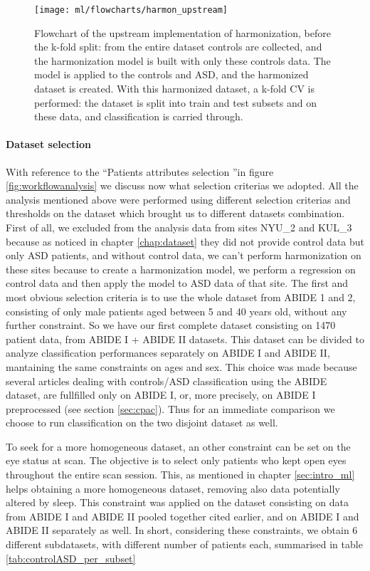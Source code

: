 \documentclass[11pt]{report}
\begin{document}
\begin{figure}[h!]
\centering
\texttt{[image: ml/flowcharts/harmon\_upstream]}
\caption{Flowchart of the upstream implementation of harmonization, before the k-fold split: from the entire dataset controls are collected, and the harmonization model is built with only these controls data. The model is applied to the controls and ASD, and the harmonized dataset is created. With this harmonized dataset, a k-fold CV is performed: the dataset is split into train and test subsets and on these data, and classification is carried through.}
\label{fig:harmon_upstream_flowchart}
\end{figure}


\paragraph{Dataset selection} \hfill

With reference to the \textquotedblleft Patients attributes selection \textquotedblright in figure \ref{fig:workflowanalysis} we discuss now what selection criterias we adopted.
All the analysis mentioned above were performed using different selection criterias and thresholds on the dataset which brought us to different datasets combination.
First of all, we excluded from the analysis data from sites NYU\_2 and KUL\_3 because as noticed in chapter \ref{chap:dataset} they did not provide control data but only ASD patients, and without control data, we can't perform harmonization on these sites because to create a harmonization model, we perform a regression on control data and then apply the model to ASD data of that site.
The first and most obvious selection criteria is to use the whole dataset from ABIDE 1 and 2, consisting of only male patients aged between 5 and 40 years old, without any further constraint. So we have our first complete dataset consisting on 1470 patient data, from ABIDE I + ABIDE II datasets.
This dataset can be divided to analyze classification performances separately on ABIDE I and ABIDE II, mantaining the same constraints on ages and sex.
This choice was made because several articles dealing with controls/ASD classification using the ABIDE dataset, are fullfilled only on ABIDE I, or, more precisely, on ABIDE I preprocessed (see section \ref{sec:cpac}). Thus for an immediate comparison we choose to run classification on the two disjoint dataset as well.

To seek for a more homogeneous dataset, an other constraint can be set on the eye status at scan. The objective is to select only patients who kept open eyes throughout the entire scan session. This, as mentioned in chapter \ref{sec:intro_ml} helps obtaining a more homogeneous dataset, removing also data potentially altered by sleep.
This constraint was applied on the dataset consisting on data from ABIDE I and ABIDE II pooled together  cited earlier, and on ABIDE I and ABIDE II separately as well.
In short, considering these constraints, we obtain 6 different subdatasets, with different number of patients each, summarised in table \ref{tab:controlASD_per_subset}
\end{document}
